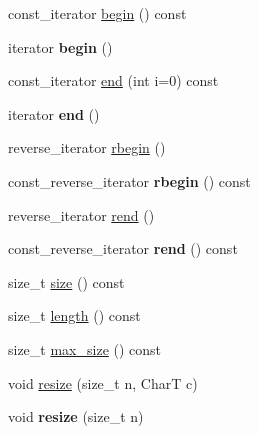 \begin{CompactItemize}
\item 
const\_\-iterator \hyperlink{classdeque__string_e7839d34819def722bdfc95900ac44cf}{begin} () const 
\item 
\hypertarget{classdeque__string_f5799afbc3735ad759d4195df919faa7}{
iterator \textbf{begin} ()}
\label{classdeque__string_f5799afbc3735ad759d4195df919faa7}

\item 
const\_\-iterator \hyperlink{classdeque__string_d0bae9f0e26dae5a1a083fb425c5858a}{end} (int i=0) const 
\item 
\hypertarget{classdeque__string_8ffd0c5fb8c71dd5fe2bfb0f6cd14a1e}{
iterator \textbf{end} ()}
\label{classdeque__string_8ffd0c5fb8c71dd5fe2bfb0f6cd14a1e}

\item 
reverse\_\-iterator \hyperlink{classdeque__string_372ecdc953661796143d9c7cb4dde563}{rbegin} ()
\item 
\hypertarget{classdeque__string_fa93bee5069f7f11e0921c9f4c9eeb7f}{
const\_\-reverse\_\-iterator \textbf{rbegin} () const }
\label{classdeque__string_fa93bee5069f7f11e0921c9f4c9eeb7f}

\item 
reverse\_\-iterator \hyperlink{classdeque__string_6816bb979aae4999ef6076889047be04}{rend} ()
\item 
\hypertarget{classdeque__string_0c09230342351f4f46748fd3fb52544f}{
const\_\-reverse\_\-iterator \textbf{rend} () const }
\label{classdeque__string_0c09230342351f4f46748fd3fb52544f}

\item 
size\_\-t \hyperlink{classdeque__string_52cac1c0f0f3f5557773b4f7ce9d53b7}{size} () const 
\item 
size\_\-t \hyperlink{classdeque__string_4cc04b6ba64f69b943b7ece1aa1e0f80}{length} () const 
\item 
size\_\-t \hyperlink{classdeque__string_c2e1561b8bb76f37f0e0f060fe520982}{max\_\-size} () const 
\item 
void \hyperlink{classdeque__string_4a344387975be7a5eebceb58143be0a7}{resize} (size\_\-t n, CharT c)
\item 
\hypertarget{classdeque__string_a07cd40867c31d0e28648943c30f5cbf}{
void \textbf{resize} (size\_\-t n)}
\label{classdeque__string_a07cd40867c31d0e28648943c30f5cbf}


\end{CompactItemize}
